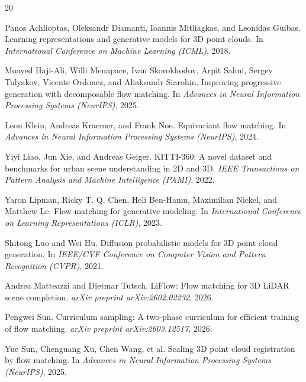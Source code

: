 \documentclass{article}
\begin{document}
\begin{thebibliography}{20}

Panos Achlioptas, Oleksandr Diamanti, Ioannis Mitliagkas, and Leonidas Guibas.
\newblock Learning representations and generative models for 3D point clouds.
\newblock In \emph{International Conference on Machine Learning (ICML)}, 2018.

Moayed Haji-Ali, Willi Menapace, Ivan Skorokhodov, Arpit Sahni, Sergey Tulyakov, Vicente Ordonez, and Aliaksandr Siarohin.
\newblock Improving progressive generation with decomposable flow matching.
\newblock In \emph{Advances in Neural Information Processing Systems (NeurIPS)}, 2025.

Leon Klein, Andreas Kraemer, and Frank Noe.
\newblock Equivariant flow matching.
\newblock In \emph{Advances in Neural Information Processing Systems (NeurIPS)}, 2024.

Yiyi Liao, Jun Xie, and Andreas Geiger.
\newblock KITTI-360: A novel dataset and benchmarks for urban scene understanding in 2D and 3D.
\newblock \emph{IEEE Transactions on Pattern Analysis and Machine Intelligence (PAMI)}, 2022.

Yaron Lipman, Ricky T. Q. Chen, Heli Ben-Hamu, Maximilian Nickel, and Matthew Le.
\newblock Flow matching for generative modeling.
\newblock In \emph{International Conference on Learning Representations (ICLR)}, 2023.

Shitong Luo and Wei Hu.
\newblock Diffusion probabilistic models for 3D point cloud generation.
\newblock In \emph{IEEE/CVF Conference on Computer Vision and Pattern Recognition (CVPR)}, 2021.

Andrea Matteazzi and Dietmar Tutsch.
\newblock LiFlow: Flow matching for 3D LiDAR scene completion.
\newblock \emph{arXiv preprint arXiv:2602.02232}, 2026.

Pengwei Sun.
\newblock Curriculum sampling: A two-phase curriculum for efficient training of flow matching.
\newblock \emph{arXiv preprint arXiv:2603.12517}, 2026.

Yue Sun, Chenguang Xu, Chen Wang, et al.
\newblock Scaling 3D point cloud registration by flow matching.
\newblock In \emph{Advances in Neural Information Processing Systems (NeurIPS)}, 2025.


\end{thebibliography}
\end{document}
